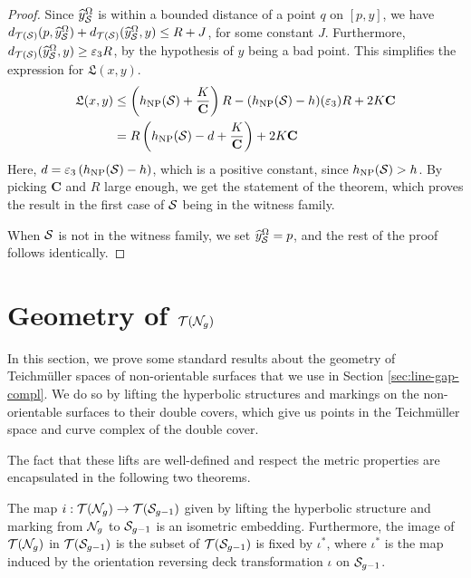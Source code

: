 \documentclass[12pt, reqno]{amsart}
\begin{document}
\begin{proof}
Since $\widehat{y}_{\mathcal{S}}^\Omega$ is within a bounded distance of a point $q$ on $[p, y]$, we have $d_{\mathcal{T}(\mathcal{S})}(p, \widehat{y}_{\mathcal{S}}^{\Omega}) + d_{\mathcal{T}(\mathcal{S})}(\widehat{y}_{\mathcal{S}}^{\Omega}, y) \leq R + J$, for some constant $J$.
Furthermore, $d_{\mathcal{T}(\mathcal{S})}(\widehat{y}_{\mathcal{S}}^{\Omega}, y) \geq \varepsilon_3 R$, by the hypothesis of $y$ being a bad point.
This simplifies the expression for $\mathfrak{L}(x,y)$.
\begin{align*}
  \mathfrak{L}(x,y) &\leq \left( h_{\mathrm{NP}}(\mathcal{S}) + \frac{K}{\mathbf{C}} \right) R - (h_{\mathrm{NP}}(\mathcal{S}) - h)(\varepsilon_3) R + 2K \mathbf{C} \\
  &= R \left( h_{\mathrm{NP}}(\mathcal{S}) - d + \frac{K}{\mathbf{C}} \right) + 2K\mathbf{C}
\end{align*}
Here, $d = \varepsilon_3 \left( h_{\mathrm{NP}}(\mathcal{S}) - h \right)$, which is a positive constant, since $h_{\mathrm{NP}}(\mathcal{S}) > h$.
By picking $\mathbf{C}$ and $R$ large enough, we get the statement of the theorem, which proves the result in the first case of $\mathcal{S}$ being in the witness family.

When $\mathcal{S}$ is not in the witness family, we set $\widehat{y}_{\mathcal{S}}^{\Omega} = p$, and the rest of the proof follows identically.
\end{proof}
\appendix

\section{Geometry of $\mathcal{T}(\mathcal{N}_g)$}
\label{sec:geom-of-teich}

In this section, we prove some standard results about the geometry of Teichmüller spaces of non-orientable surfaces that we use in Section \ref{sec:line-gap-compl}.
We do so by lifting the hyperbolic structures and markings on the non-orientable surfaces to their double covers, which give us points in the Teichmüller space and curve complex of the double cover.

The fact that these lifts are well-defined and respect the metric properties are encapsulated in the following two theorems.

\begin{theorem}
  \label{thm:i-embedding-teich-space}
  The map $i : \mathcal{T}(\mathcal{N}_g) \to \mathcal{T}(\mathcal{S}_{g-1})$ given by lifting the hyperbolic structure and marking from $\mathcal{N}_g$ to $\mathcal{S}_{g-1}$ is an isometric embedding.
  Furthermore, the image of $\mathcal{T}(\mathcal{N}_g)$ in $\mathcal{T}(\mathcal{S}_{g-1})$ is the subset of $\mathcal{T}(\mathcal{S}_{g-1})$ is fixed by $\iota^{\ast}$, where $\iota^{\ast}$ is the map induced by the orientation reversing deck transformation $\iota$ on $\mathcal{S}_{g-1}$.
\end{theorem}
\end{document}
